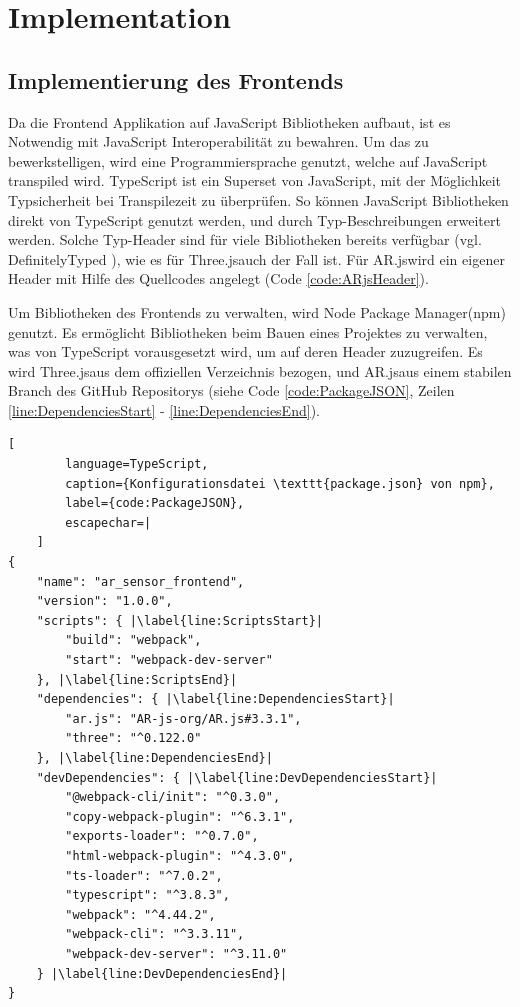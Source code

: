 \section{Implementation}


\subsection{Implementierung des Frontends}

Da die Frontend Applikation auf JavaScript Bibliotheken aufbaut,
ist es Notwendig mit JavaScript Interoperabilität zu bewahren.
Um das zu bewerkstelligen, wird eine Programmiersprache genutzt,
welche auf JavaScript transpiled wird. TypeScript ist ein
Superset von JavaScript, mit der Möglichkeit Typsicherheit bei
Transpilezeit zu überprüfen. So können JavaScript Bibliotheken
direkt von TypeScript genutzt werden, und durch Typ-Beschreibungen
erweitert werden. Solche Typ-Header sind für viele Bibliotheken
bereits verfügbar (vgl. DefinitelyTyped \cite{DefinitelyTyped}),
wie es für \grqq Three.js\grqq\space auch der Fall ist. Für
\grqq AR.js\grqq\space wird ein eigener Header mit Hilfe des
Quellcodes angelegt (Code \ref{code:ARjsHeader}).

\bigskip



Um Bibliotheken des Frontends zu verwalten, wird \grqq Node
Package Manager\grqq\space (npm) genutzt. Es ermöglicht
Bibliotheken beim Bauen eines Projektes zu verwalten, was von
TypeScript vorausgesetzt wird, um auf deren Header zuzugreifen.
Es wird \grqq Three.js\grqq\space aus dem offiziellen Verzeichnis
bezogen, und \grqq AR.js\grqq\space aus einem stabilen Branch des
GitHub Repositorys (siehe Code \ref{code:PackageJSON}, Zeilen
\ref{line:DependenciesStart} - \ref{line:DependenciesEnd}).

\begin{codefloat}
	\begin{lstlisting}[
		language=TypeScript,
		caption={Konfigurationsdatei \texttt{package.json} von npm},
		label={code:PackageJSON},
		escapechar=|
	]
{
	"name": "ar_sensor_frontend",
	"version": "1.0.0",
	"scripts": { |\label{line:ScriptsStart}|
		"build": "webpack",
		"start": "webpack-dev-server"
	}, |\label{line:ScriptsEnd}|
	"dependencies": { |\label{line:DependenciesStart}|
		"ar.js": "AR-js-org/AR.js#3.3.1",
		"three": "^0.122.0"
	}, |\label{line:DependenciesEnd}|
	"devDependencies": { |\label{line:DevDependenciesStart}|
		"@webpack-cli/init": "^0.3.0",
		"copy-webpack-plugin": "^6.3.1",
		"exports-loader": "^0.7.0",
		"html-webpack-plugin": "^4.3.0",
		"ts-loader": "^7.0.2",
		"typescript": "^3.8.3",
		"webpack": "^4.44.2",
		"webpack-cli": "^3.3.11",
		"webpack-dev-server": "^3.11.0"
	} |\label{line:DevDependenciesEnd}|
}
	\end{lstlisting}
\end{codefloat}

